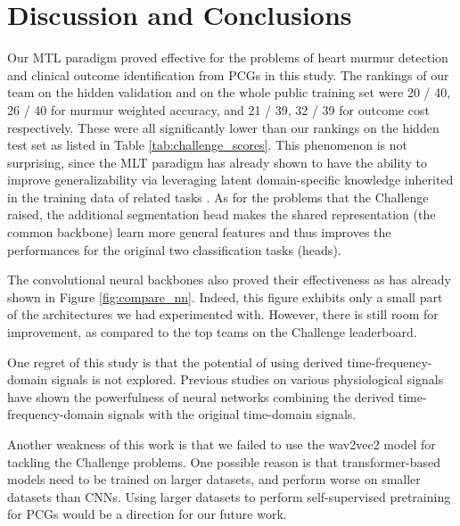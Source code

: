 \section{Discussion and Conclusions}
\label{sec:discu}

Our MTL paradigm proved effective for the problems of heart murmur detection and clinical outcome identification from PCGs in this study. The rankings of our team on the hidden validation and on the whole public training set were 20 / 40, 26 / 40 for murmur weighted accuracy, and 21 / 39, 32 / 39 for outcome cost respectively. These were all significantly lower than our rankings on the hidden test set as listed in Table \ref{tab:challenge_scores}. This phenomenon is not surprising, since the MLT paradigm has already shown to have the ability to improve generalizability via leveraging latent domain-specific knowledge inherited in the training data of related tasks \cite{Caruana_1997_mtl}. As for the problems that the Challenge raised, the additional segmentation head makes the shared representation (the common backbone) learn more general features and thus improves the performances for the original two classification tasks (heads).

The convolutional neural backbones also proved their effectiveness as has already shown in Figure \ref{fig:compare_nn}. Indeed, this figure exhibits only a small part of the architectures we had experimented with. However, there is still room for improvement, as compared to the top teams on the Challenge leaderboard.

One regret of this study is that the potential of using derived time-frequency-domain signals is not explored. Previous studies on various physiological signals have shown the powerfulness of neural networks combining the derived time-frequency-domain signals with the original time-domain signals.

Another weakness of this work is that we failed to use the wav2vec2 model for tackling the Challenge problems. One possible reason is that transformer-based models need to be trained on larger datasets, and perform worse on smaller datasets than CNNs. Using larger datasets to perform self-supervised pretraining for PCGs would be a direction for our future work.
